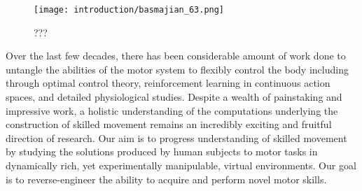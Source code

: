 \documentclass[../main.tex]{subfiles}
\begin{document}


\begin{figure}
  \centering
  \texttt{[image: introduction/basmajian\_63.png]}
  \caption{???}
  \label{fig:basmajian_63}
\end{figure}

Over the last few decades, there has been considerable amount of work done to untangle the abilities of the motor system to flexibly control the body including through optimal control theory\cite{Todorov2004}, reinforcement learning in continuous action spaces\cite{koberReinforcementLearningRobotics2013}, and detailed physiological studies\cite{sauerbreiCorticalPatternGeneration2019}. Despite a wealth of painstaking and impressive work, a holistic understanding of the computations underlying the construction of skilled movement remains an incredibly exciting and fruitful direction of research. Our aim is to progress understanding of skilled movement by studying the solutions produced by human subjects to motor tasks in dynamically rich, yet experimentally manipulable, virtual environments. Our goal is to reverse-engineer the ability to acquire and perform novel motor skills.
\end{document}
